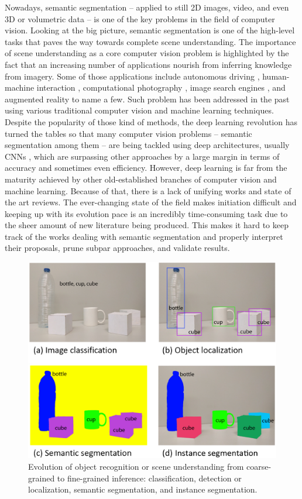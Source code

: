 Nowadays, semantic segmentation -- applied to still 2D images, video, and even 3D or volumetric data -- is one of the key problems in the field of computer vision. Looking at the big picture, semantic segmentation is one of the high-level tasks that paves the way towards complete scene understanding. The importance of scene understanding as a core computer vision problem is highlighted by the fact that an increasing number of applications nourish from inferring knowledge from imagery. Some of those applications include autonomous driving \cite{Ess2009, Geiger2012, Cordts2016}, human-machine interaction \cite{Oberweger2015}, computational photography \cite{Yoon2015}, image search engines \cite{Wan2014}, and augmented reality to name a few. Such problem has been addressed in the past using various traditional computer vision and machine learning techniques. Despite the popularity of those kind of methods, the deep learning revolution has turned the tables so that many computer vision problems -- semantic segmentation among them -- are being tackled using deep architectures, usually \acp{CNN} \cite{Ning2005, Ciresan2012, Farabet2013, Hariharan2014, Gupta2014}, which are surpassing other approaches by a large margin in terms of accuracy and sometimes even efficiency. However, deep learning is far from the maturity achieved by other old-established branches of computer vision and machine learning. Because of that, there is a lack of unifying works and state of the art reviews. The ever-changing state of the field makes initiation difficult and keeping up with its evolution pace is an incredibly time-consuming task due to the sheer amount of new literature being produced. This makes it hard to keep track of the works dealing with semantic segmentation and properly interpret their proposals, prune subpar approaches, and validate results.

\begin{figure}[!b]
	\centering
	\includegraphics[width=0.8\linewidth]{Figures/Segmentation/example_rework.eps}
	\caption{Evolution of object recognition or scene understanding from coarse-grained to fine-grained inference: classification, detection or localization, semantic segmentation, and instance segmentation.}
	\label{fig:background_evolution}
\end{figure}

